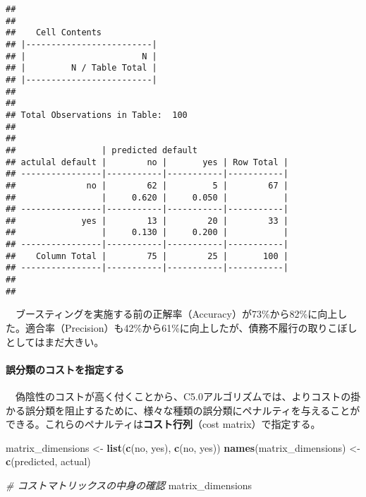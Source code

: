 \documentclass[
]{article}
\newenvironment{Shaded}{\begin{snugshade}}{\end{snugshade}}
\newcommand{\CommentTok}[1]{\textcolor[rgb]{0.56,0.35,0.01}{\textit{#1}}}
\newcommand{\FunctionTok}[1]{\textcolor[rgb]{0.13,0.29,0.53}{\textbf{#1}}}
\newcommand{\NormalTok}[1]{#1}
\newcommand{\OtherTok}[1]{\textcolor[rgb]{0.56,0.35,0.01}{#1}}
\newcommand{\StringTok}[1]{\textcolor[rgb]{0.31,0.60,0.02}{#1}}
\begin{document}
\begin{verbatim}
## 
##  
##    Cell Contents
## |-------------------------|
## |                       N |
## |         N / Table Total |
## |-------------------------|
## 
##  
## Total Observations in Table:  100 
## 
##  
##                 | predicted default 
## actulal default |        no |       yes | Row Total | 
## ----------------|-----------|-----------|-----------|
##              no |        62 |         5 |        67 | 
##                 |     0.620 |     0.050 |           | 
## ----------------|-----------|-----------|-----------|
##             yes |        13 |        20 |        33 | 
##                 |     0.130 |     0.200 |           | 
## ----------------|-----------|-----------|-----------|
##    Column Total |        75 |        25 |       100 | 
## ----------------|-----------|-----------|-----------|
## 
## 
\end{verbatim}

　ブースティングを実施する前の正解率（Accuracy）が73\%から82\%に向上した。適合率（Precision）も42\%から61\%に向上したが、債務不履行の取りこぼしとしてはまだ大きい。

\paragraph{誤分類のコストを指定する}\label{ux8aa4ux5206ux985eux306eux30b3ux30b9ux30c8ux3092ux6307ux5b9aux3059ux308b}

　偽陰性のコストが高く付くことから、C5.0アルゴリズムでは、よりコストの掛かる誤分類を阻止するために、様々な種類の誤分類にペナルティを与えることができる。これらのペナルティは\textbf{コスト行列}（cost
matrix）で指定する。

\begin{Shaded}
\begin{Highlighting}[]
\NormalTok{matrix\_dimensions }\OtherTok{\textless{}{-}} \FunctionTok{list}\NormalTok{(}\FunctionTok{c}\NormalTok{(}\StringTok{\textquotesingle{}no\textquotesingle{}}\NormalTok{, }\StringTok{\textquotesingle{}yes\textquotesingle{}}\NormalTok{), }\FunctionTok{c}\NormalTok{(}\StringTok{\textquotesingle{}no\textquotesingle{}}\NormalTok{, }\StringTok{\textquotesingle{}yes\textquotesingle{}}\NormalTok{))}
\FunctionTok{names}\NormalTok{(matrix\_dimensions) }\OtherTok{\textless{}{-}} \FunctionTok{c}\NormalTok{(}\StringTok{\textquotesingle{}predicted\textquotesingle{}}\NormalTok{, }\StringTok{\textquotesingle{}actual\textquotesingle{}}\NormalTok{)}

\CommentTok{\# コストマトリックスの中身の確認}
\NormalTok{matrix\_dimensions}
\end{Highlighting}
\end{Shaded}
\end{document}
